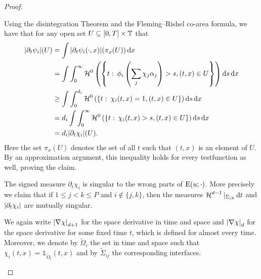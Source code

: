 \begin{proof}
\begin{description}[wide=0pt]
		Using the disintegration Theorem 
		\cite[Thm.~3.103]{ambrosio_fusco_pallara_functions_of_bv_and_free_discontinuity_problems}
		 and the Fleming--Rishel co-area formula, we have that for any open set 
		$ U \subseteq [ 0 , T ] \times \operatorname{\mathbb{T}} $ that
		\begin{align*}
			\abs{
				\partial_{ t } \psi_{ i }
			} ( U ) 
			& =
			\int
			\abs{ 
				\partial_{ t } \psi_{ i } ( \cdot , x )
			} ( \pi_{ x } ( U ) ) 
			\dd{ x }
			\\
			& =
			\int
			\int_{ 0 }^{ \infty }
			\operatorname{\mathcal{H}}^{ 0 } \left(
			\left\{
			t 
			\, \colon \,
			\phi_{ i } 
			\left( \sum_{ j } \chi_{ j } \alpha_{ j } \right) > s,
			( t, x ) \in U
			\right\}
			\right)
			\dd{ s }
			\dd{ x }
			\\
			& \geq
			\int
			\int_{ 0 }^{ d_{ i } }
			\operatorname{\mathcal{H}}^{ 0 }
			\left(
			\left\{
			t 
			\, \colon \,
			\chi_{ i } ( t , x ) = 1,
			( t, x ) \in U
			\right\}
			\right)
			\dd{ s }
			\dd{ x }
			\\
			& =
			d_{ i }
			\int
			\int_{ 0 }^{ \infty }
			\operatorname{\mathcal{H}}^{ 0 } \left(
			\left\{
			t 
			\, \colon \,
			\chi_{ i } ( t , x ) > s , ( t , x ) \in U
			\right\}
			\right)
			\dd{ s }
			\dd{ x }
			\\
			& =
			d_{ i }
			\abs{ \partial_{ t } \chi_{ i } } ( U ).
		\end{align*}
		Here the set $ \pi_{ x } ( U ) $ denotes the set of all $ t $ such that 
		$ ( t , x ) $ is an element of $ U $.
		By an approximation argument, this inequality holds for every 
		testfunction as well, proving the claim.
		
		\item[Step 3:] The signed measure $ \partial_{ t } \chi_{ i } $ is 
		singular to the wrong parts of $ \operatorname{E} ( u ; \cdot ) $. More 
		precisely we claim that if $ 1 \leq j < k \leq P $ and $ i \notin \{ j 
		, k \} $, then the measures 
		$ \operatorname{\mathcal{H}}^{ d - 1 } |_{ \Sigma_{ j k } } \dd{ t } $ and $ \abs{ \partial_{ 
				t } \chi_{ i } } $ are mutually singular.
		
		We again write $ \abs{ \nabla \chi }_{ d + 1 } $ for the space 
		derivative in time and space and $ \abs{ \nabla \chi }_{ d } $ for the 
		space derivative for some fixed time $ t $, which is defined for almost 
		every time. Moreover, we denote by $ \tilde{ \Omega }_{ i } $ the set 
		in time and space such that
		$ \chi_{ i } ( t , x ) = \mathds{ 1 }_{ \tilde{ \Omega }_{ i } } ( t , 
		x ) $
		and by $ \tilde{ \Sigma }_{ i j } $ the corresponding interfaces.
		

\end{description}
\end{proof}
